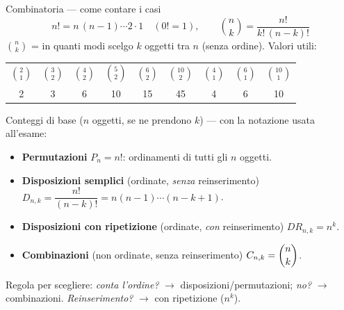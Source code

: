 \documentclass[11pt]{article}
\begin{document}
\begin{concetto}[barSlate]{Combinatoria --- come contare i casi}
\[ n! = n\,(n-1)\cdots 2 \cdot 1 \quad (0! = 1), \qquad \binom{n}{k} = \frac{n!}{k!\,(n-k)!} \]
$\binom{n}{k}$ = in quanti modi scelgo $k$ oggetti tra $n$ (senza ordine). Valori utili:
\begin{center}
\begin{tabular}{ccccccccc}
$\binom{2}{1}$ & $\binom{3}{2}$ & $\binom{4}{2}$ & $\binom{5}{2}$ & $\binom{6}{2}$ & $\binom{10}{2}$ & $\binom{4}{1}$ & $\binom{6}{1}$ & $\binom{10}{1}$ \\
2 & 3 & 6 & 10 & 15 & 45 & 4 & 6 & 10 \\
\end{tabular}
\end{center}
Conteggi di base ($n$ oggetti, se ne prendono $k$) --- con la notazione usata all'esame:
\begin{itemize}[leftmargin=1.2em,itemsep=2pt,topsep=2pt]
\item \textbf{Permutazioni} $P_n = n!$: ordinamenti di tutti gli $n$ oggetti.
\item \textbf{Disposizioni semplici} (ordinate, \emph{senza} reinserimento) $D_{n,k} = \dfrac{n!}{(n-k)!} = n(n-1)\cdots(n-k+1)$.
\item \textbf{Disposizioni con ripetizione} (ordinate, \emph{con} reinserimento) $DR_{n,k} = n^k$.
\item \textbf{Combinazioni} (non ordinate, senza reinserimento) $C_{n,k} = \dbinom{n}{k}$.
\end{itemize}
Regola per scegliere: \emph{conta l'ordine?} $\to$ disposizioni/permutazioni; \emph{no?} $\to$ combinazioni. \emph{Reinserimento?} $\to$ con ripetizione ($n^k$).
\end{concetto}
\end{document}
